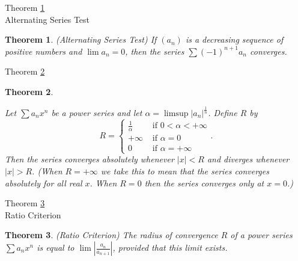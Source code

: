 \documentclass[avery5371,grid]{flashcards}
\newtheorem{theorem}{Theorem}
\begin{document}
\begin{flashcard}[Theorem]{Theorem \ref{thm112}\\
Alternating Series Test}
\begin{theorem}
\label{thm112}
(Alternating Series Test)  If $(a_n)$ is a decreasing sequence
of positive numbers and $\lim a_n = 0$, then the series $\displaystyle
\sum (-1)^{n+1} a_n$ converges.
\end{theorem}
\end{flashcard}

\begin{flashcard}[Theorem]{Theorem \ref{thm113}}
\begin{theorem}
\label{thm113}
\begin{small}
Let $\displaystyle \sum a_n x^n$ be a power series and let
$\alpha = \limsup |a_n|^{\frac 1n}$.  Define $R$ by
$$R = \left\{ \begin{array}{ll} \frac 1{\alpha} & \mbox{ if } 0 < \alpha < +
\infty \\ + \infty & \mbox{ if } \alpha = 0 \\ 0 & \mbox{ if } \alpha = + \infty
\end{array} \right. .$$
Then the series converges absolutely whenever $|x| < R$ and diverges whenever
$|x| > R$.  (When $R = + \infty$ we take this to mean that the series converges
absolutely for all real $x$.  When $R=0$ then the series converges only at
$x=0$.)
\end{small}
\end{theorem}
\end{flashcard}

\begin{flashcard}[Theorem]{Theorem \ref{thm114}\\
Ratio Criterion}
\begin{theorem}
\label{thm114}
(Ratio Criterion)  The radius of convergence $R$ of a power
series $\displaystyle \sum a_n x^n$ is equal to $\displaystyle \lim \left|
\frac{a_n}{a_{n+1}} \right|$, provided that this limit exists.
\end{theorem}
\end{flashcard}
\end{document}
